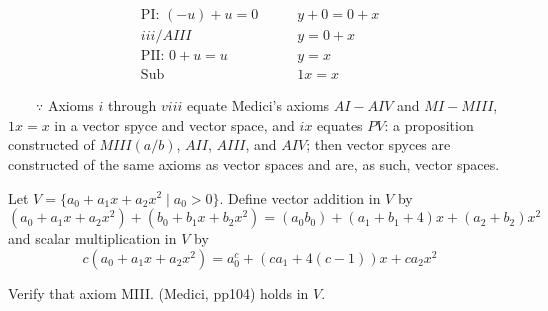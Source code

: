 \documentclass[10pt]{article}
\newcommand{\noin}{\noindent}
\begin{document}
{{\begin{align}
            \text{PI: $(-u)+u=0$}\qquad&y + 0 = 0 + x \\
            {iii/AIII}\qquad&y = 0 + x \\
            \text{PII: $0+u=u$}\qquad&y = x \\ 
            \text{Sub}\qquad&1x = x
        \end{align}
        \begin{flushleft}
            $\qquad\because$ Axioms $i$ through $viii$ equate Medici's axioms $AI-AIV$ and $MI-MIII$, $1x=x$ in a vector spyce and vector space, and $ix$ equates $PV$: a proposition constructed of $MIII(a/b)$, $AII$, $AIII$, and $AIV$; then vector spyces are constructed of the same axioms as vector spaces and are, as such, vector spaces. 
        \end{flushleft}
	}
}


\pagebreak 


\noin {\bf 2.}  Let $V=\{ a_0+a_1x+a_2x^2 \mid a_0>0 \}$.  Define vector addition in $V$ by 
$$(a_0+a_1x+a_2x^2)+(b_0+b_1x+b_2x^2) = (a_0b_0)+(a_1+b_1+4)x+(a_2+b_2)x^2$$
and scalar multiplication in $V$ by
$$c(a_0+a_1x+a_2x^2) = a_0^c+(ca_1+4(c-1))x+ca_2x^2$$

\vspace{20pt}
\noin Verify that axiom MIII. (Medici, pp104) holds in $V$.
\end{document}
